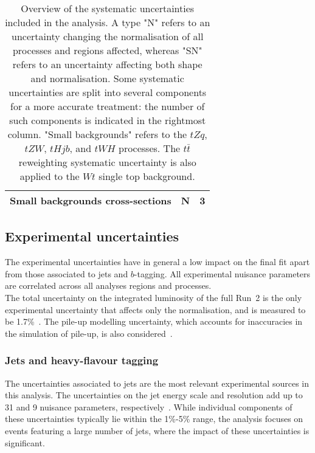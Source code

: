 \begin{table}[htbp]
\begin{tabular}{lcc}
  \hspace{2ex}Small backgrounds cross-sections	&   N  &  3  \\
  \bottomrule
  \bottomrule
  \end{tabular}
  \caption{
  Overview of the systematic uncertainties included in the analysis.
  A type "N" refers to an uncertainty changing the normalisation of all processes and regions affected,  whereas "SN" refers to an uncertainty affecting both shape and normalisation. Some systematic uncertainties are split into several components for a more accurate treatment:  the number of such components is indicated in the rightmost column.
  "Small backgrounds" refers to the $tZq$, $tZW$, %
  $tHjb$, and $tWH$ processes. The $t\bar t$ reweighting systematic uncertainty is also applied to the $Wt$ single top background.
  }
  \label{Hplustb:tablesys}
\end{table}

\subsection{Experimental uncertainties}
\label{Hplustb:SectionExperimentalUnc}
The experimental uncertainties have in general a low impact on the final fit apart from those associated to jets and $b$-tagging. All experimental nuisance parameters are correlated across all analyses regions and processes.\\

The total uncertainty on the integrated luminosity of the full Run~2 is the only experimental uncertainty that affects only the normalisation, and is measured to be 1.7\%~\cite{luminosity}. The pile-up modelling uncertainty, which accounts for inaccuracies in the simulation of pile-up, is also considered~\cite{PhysRevLett.117.182002}.

\subsubsection{Jets and heavy-flavour tagging}
The uncertainties associated to jets are the most relevant experimental sources in this analysis. The uncertainties on the jet energy scale and resolution add up to 31 and 9 nuisance parameters, respectively~\cite{ATLAS_Collaboration2020-ip,Aaboud_2020}. While individual components of these uncertainties typically lie within the 1\%-5\% range, the analysis focuses on events featuring a large number of jets, where the impact of these uncertainties is significant.\\

